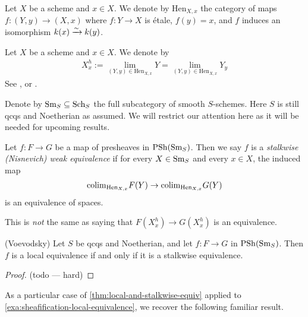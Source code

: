 \documentclass[11pt]{amsart}
\renewcommand{\Pre}{\mathrm{PSh}}
\providecommand{\Hen}{\mathrm{Hen}}
\begin{document}
\begin{notation} Let $X$ be a scheme and $x\in X$. We denote by $\Hen_{X,x}$ the category of maps $f \colon (Y,y) \to (X,x)$ where $f \colon Y \to X$ is \'etale, $f(y) = x$, and $f$ induces an isomorphism $k(x) \xrightarrow{\sim} k(y)$.
\end{notation}


\begin{definition} Let $X$ be a scheme and $x\in X$. We denote by 
\begin{align*}
    X_x^h := \lim_{(Y,y) \in \Hen_{X,x}} Y = \lim_{(Y,y) \in \Hen_{X,x}} Y_y
\end{align*}
See \cite[04GV]{Stacks}, or \cite[2.22]{Bachmann-K}.
\end{definition}

\begin{notation} Denote by $\mathrm{Sm}_S \subseteq \mathrm{Sch}_S$ the full subcategory of smooth $S$-schemes. Here $S$ is still qcqs and Noetherian as assumed. We will restrict our attention here as it will be needed for upcoming results.
\end{notation}

\begin{definition} Let $f \colon F \to G$ be a map of presheaves in $\Pre(\Sm_S)$. Then we say $f$ is a \textit{stalkwise (Nisnevich) weak equivalence} if for every $X\in \mathrm{Sm}_S$ and every $x\in X$, the induced map
\begin{align*}
    \colim_{\Hen_{X,x}} F(Y) \to \colim_{\Hen_{X,x}} G(Y)
\end{align*}
is an equivalence of spaces.
\end{definition}

\begin{warning} This is \textit{not} the same as saying that $F(X_x^h) \to G(X_x^h)$ is an equivalence.
\end{warning}



\begin{theorem}\label{thm:local-and-stalkwise-equiv} 
(Voevodsky) Let $S$ be qcqs and Noetherian, and let $f \colon F \to G$ in $\Pre(\Sm_S)$. Then $f$ is a local equivalence if and only if it is a stalkwise equivalence.
\end{theorem}
\begin{proof} (todo --- hard)
\end{proof}

As a particular case of \autoref{thm:local-and-stalkwise-equiv} applied to \autoref{exa:sheafification-local-equivalence}, we recover the following familiar result.
\end{document}
